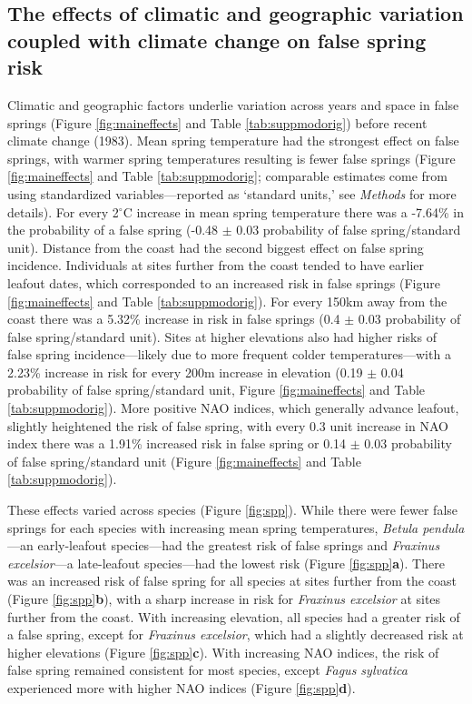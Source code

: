 \documentclass{article}\usepackage[]{graphicx}\usepackage[]{color}
\begin{document}
\subsection*{The effects of climatic and geographic variation coupled with climate change on false spring risk}
Climatic and geographic factors underlie variation across years and space in false springs (Figure \ref{fig:maineffects} and Table \ref{tab:suppmodorig}) before recent climate change (1983). Mean spring temperature had the strongest effect on false springs, with warmer spring temperatures resulting is fewer false springs (Figure \ref{fig:maineffects} and Table \ref{tab:suppmodorig}; comparable estimates come from using standardized variables---reported as `standard units,' see \textit{Methods} for more details). For every 2$^{\circ}$C increase in mean spring temperature there was a -7.64\% in the probability of a false spring (-0.48 $\pm$ 0.03 probability of false spring/standard unit). Distance from the coast had the second biggest effect on false spring incidence. Individuals at sites further from the coast tended to have earlier leafout dates, which corresponded to an increased risk in false springs (Figure \ref{fig:maineffects} and Table \ref{tab:suppmodorig}). For every 150km away from the coast there was a 5.32\% increase in risk in false springs (0.4 $\pm$ 0.03 probability of false spring/standard unit). Sites at higher elevations also had higher risks of false spring incidence---likely due to more frequent colder temperatures---with a 2.23\% increase in risk for every 200m increase in elevation (0.19 $\pm$ 0.04 probability of false spring/standard unit, Figure \ref{fig:maineffects} and Table \ref{tab:suppmodorig}). More positive NAO indices, which generally advance leafout, slightly heightened the risk of false spring, with every 0.3 unit increase in NAO index there was a 1.91\% increased risk in false spring or 0.14 $\pm$ 0.03 probability of false spring/standard unit (Figure \ref{fig:maineffects} and Table \ref{tab:suppmodorig}).  

These effects varied across species (Figure \ref{fig:spp}). While there were fewer false springs for each species with increasing mean spring temperatures,  \textit{Betula pendula}---an early-leafout species---had the greatest risk of false springs and \textit{Fraxinus excelsior}---a late-leafout species---had the lowest risk (Figure \ref{fig:spp}\textbf{a}). There was an increased risk of false spring for all species at sites further from the coast (Figure \ref{fig:spp}\textbf{b}), with a sharp increase in risk for \textit{Fraxinus excelsior} at sites further from the coast. With increasing elevation, all species had a greater risk of a false spring, except for \textit{Fraxinus excelsior}, which had a slightly decreased risk at higher elevations (Figure \ref{fig:spp}\textbf{c}).  With increasing NAO indices, the risk of false spring remained consistent for most species, except \textit{Fagus sylvatica} experienced more with higher NAO indices (Figure \ref{fig:spp}\textbf{d}). 
\end{document}
